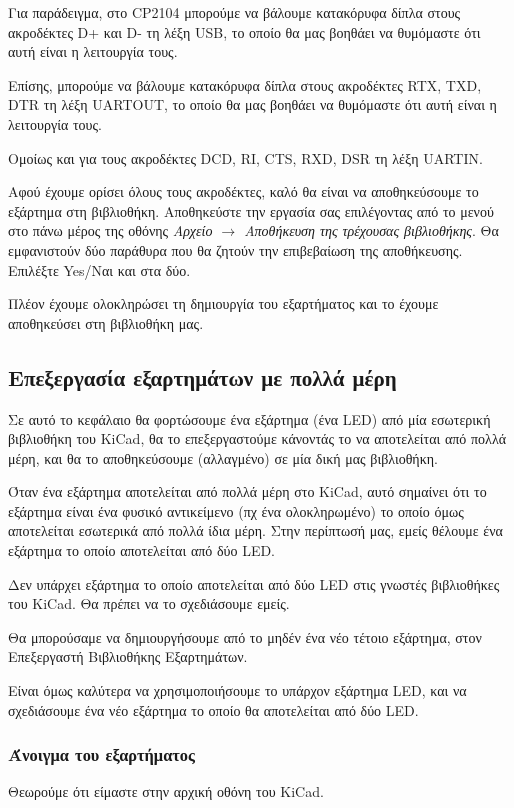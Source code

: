 \documentclass[a4paper]{article}
\begin{document}
Για παράδειγμα, στο CP2104 μπορούμε να βάλουμε κατακόρυφα δίπλα στους ακροδέκτες D+ και D- τη λέξη USB, το οποίο θα μας βοηθάει να θυμόμαστε ότι αυτή είναι η λειτουργία τους.

Επίσης, μπορούμε να βάλουμε κατακόρυφα δίπλα στους ακροδέκτες RTX, TXD, DTR τη λέξη UARTOUT, το οποίο θα μας βοηθάει να θυμόμαστε ότι αυτή είναι η λειτουργία τους.

Ομοίως και για τους ακροδέκτες DCD, RI, CTS, RXD, DSR τη λέξη UARTΙΝ.

Αφού έχουμε ορίσει όλους τους ακροδέκτες, καλό θα είναι να αποθηκεύσουμε το εξάρτημα στη βιβλιοθήκη. Αποθηκεύστε την εργασία σας επιλέγοντας από το μενού στο πάνω μέρος της οθόνης \textit{Αρχείο $\rightarrow$ Αποθήκευση της τρέχουσας βιβλιοθήκης}. Θα εμφανιστούν δύο παράθυρα που θα ζητούν την επιβεβαίωση της αποθήκευσης. Επιλέξτε Yes/Ναι και στα δύο.

Πλέον έχουμε ολοκληρώσει τη δημιουργία του εξαρτήματος και το έχουμε αποθηκεύσει στη βιβλιοθήκη μας.


\subsection{Επεξεργασία εξαρτημάτων με πολλά μέρη}

Σε αυτό το κεφάλαιο θα φορτώσουμε ένα εξάρτημα (ένα LED) από μία εσωτερική βιβλιοθήκη του \textenglish{KiCad}, θα το επεξεργαστούμε κάνοντάς το να αποτελείται από πολλά μέρη, και θα το αποθηκεύσουμε (αλλαγμένο) σε μία δική μας βιβλιοθήκη.

Όταν ένα εξάρτημα αποτελείται από πολλά μέρη στο \textenglish{KiCad}, αυτό σημαίνει ότι το εξάρτημα είναι ένα φυσικό αντικείμενο (πχ ένα ολοκληρωμένο) το οποίο όμως αποτελείται εσωτερικά από πολλά ίδια μέρη. Στην περίπτωσή μας, εμείς θέλουμε ένα εξάρτημα το οποίο αποτελείται από δύο LED.

Δεν υπάρχει εξάρτημα το οποίο αποτελείται από δύο LED στις γνωστές βιβλιοθήκες του \textenglish{KiCad}. Θα πρέπει να το σχεδιάσουμε εμείς.

Θα μπορούσαμε να δημιουργήσουμε από το μηδέν ένα νέο τέτοιο εξάρτημα, στον Επεξεργαστή Βιβλιοθήκης Εξαρτημάτων. 

Είναι όμως καλύτερα να χρησιμοποιήσουμε το υπάρχον εξάρτημα LED, και να σχεδιάσουμε ένα νέο εξάρτημα το οποίο θα αποτελείται από δύο LED.

\subsubsection{Άνοιγμα του εξαρτήματος}
Θεωρούμε ότι είμαστε στην αρχική οθόνη του \textenglish{KiCad}. 
\end{document}
